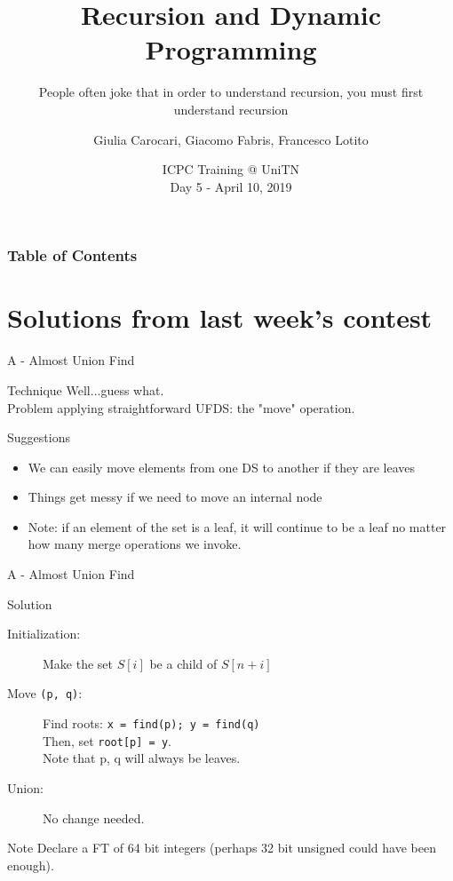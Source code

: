 \documentclass{beamer}
\title{Recursion and Dynamic Programming}
\subtitle{People often joke that in order to understand recursion, you must first understand recursion}
\author[Carocari, Fabris, Lotito]
{Giulia Carocari, Giacomo Fabris, Francesco Lotito}
\institute[UniTN]{Università degli Studi di Trento}
\date[April 10, 2019]
{ICPC Training @ UniTN\\ Day 5 - April 10, 2019}
\begin{document}
 
  \frame{\titlepage}
  \begin{frame} 
      \frametitle{Table of Contents}
      \tableofcontents
  \end{frame}
  
  \section{Solutions from last week's contest}
  
  \begin{frame}{A - Almost Union Find}
  \begin{block}{Technique}
  Well...guess what.\\
  Problem applying straightforward UFDS: the "move" operation.
  \end{block}
  
  \begin{block}{Suggestions}
  \begin{itemize}
  \item We can easily move elements from one DS to another if they are leaves
  \item Things get messy if we need to move an internal node
  \item Note: if an element of the set is a leaf, it will continue to be a leaf no matter how many merge operations we invoke.
  \end{itemize}
  \end{block}
  \end{frame}
  
  \begin{frame}{A - Almost Union Find}
  \begin{block}{Solution}
  \begin{description}
  \item[Initialization:] Make the set $S[i]$ be a child of $S[n+i]$
  \item[Move \texttt{(p, q)}:] Find roots: \texttt{x = find(p); y = find(q)}\\
  Then, set \texttt{root[p] = y}.\\ Note that p, q will always be leaves.
  \item[Union:] No change needed.
  \end{description}
  \end{block}
  
  \begin{block}{Note}
  Declare a FT of 64 bit integers (perhaps 32 bit unsigned could have been enough). 
  \end{block}
  \end{frame}
  
\end{document}
